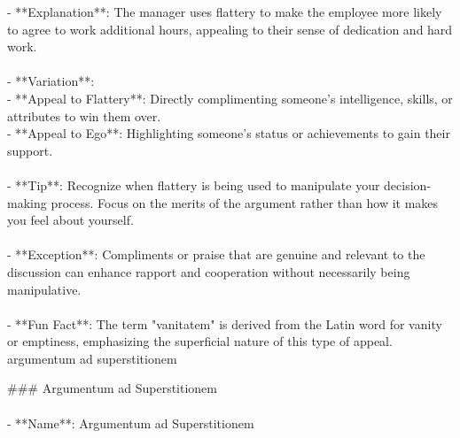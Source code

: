 \documentclass[a4paper,12pt,single,pdftex]{scrbook}
\begin{document}
    
        - **Explanation**: The manager uses flattery to make the employee more likely to agree to work additional hours, appealing to their sense of dedication and hard work.
    \\

    
      
    \\

    
      - **Variation**:
    \\

    
        - **Appeal to Flattery**: Directly complimenting someone's intelligence, skills, or attributes to win them over.
    \\

    
        - **Appeal to Ego**: Highlighting someone's status or achievements to gain their support.
    \\

    
      
    \\

    
      - **Tip**: Recognize when flattery is being used to manipulate your decision-making process. Focus on the merits of the argument rather than how it makes you feel about yourself.
    \\

    
      
    \\

    
      - **Exception**: Compliments or praise that are genuine and relevant to the discussion can enhance rapport and cooperation without necessarily being manipulative.
    \\

    
      
    \\

    
      - **Fun Fact**: The term "vanitatem" is derived from the Latin word for vanity or emptiness, emphasizing the superficial nature of this type of appeal.
    \\

  

argumentum ad superstitionem
    
      \#\#\# Argumentum ad Superstitionem
    \\

    
      
    \\

    
      - **Name**: Argumentum ad Superstitionem
    \\
\end{document}
